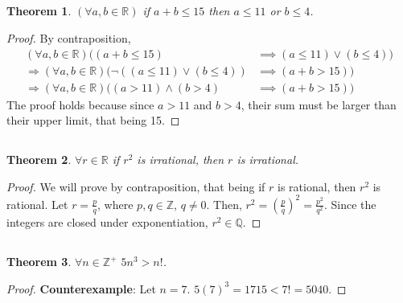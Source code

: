 \documentclass{article}
\newtheorem{genthm}{Theorem}
\newcommand{\Z}{\mathbb{Z}}
\newcommand{\Q}{\mathbb{Q}}
\newcommand{\R}{\mathbb{R}}
\begin{document}
\subsection{}

\begin{genthm}
    \((\forall a, b \in \R)\) if \(a + b \leqslant 15\) then \(a \leqslant 11\) or \(b \leqslant 4\).
\end{genthm}
\begin{proof}
By contraposition,
\begin{align}
    (\forall a, b \in \R)((a + b \leqslant 15) &\implies (a \leqslant 11) \lor (b \leqslant 4)) \\
    \Rightarrow (\forall a, b \in \R)(\lnot ((a \leqslant 11) \lor (b \leqslant 4)) &\implies (a + b > 15)) \\
    \Rightarrow (\forall a, b \in \R)((a > 11) \land (b > 4) &\implies (a + b > 15))
\end{align}
The proof holds because since \(a > 11\) and \(b > 4\), their sum must be larger than their upper limit, that being 15.
\end{proof}

\subsection{}

\begin{genthm}
    \(\forall r \in \R\) if \(r^2\) is irrational, then \(r\) is irrational.
\end{genthm}
\begin{proof}
We will prove by contraposition, that being if \(r\) is rational, then \(r^2\) is rational.
Let \(r = \frac{p}{q}\), where \(p, q \in \Z\), \(q \neq 0\).
Then, \(r^2 = \left(\frac{p}{q}\right)^2 = \frac{p^2}{q^2}\).
Since the integers are closed under exponentiation, \(r^2 \in \Q\).
\end{proof}

\subsection{}

\begin{genthm}
    \(\forall n \in \Z^+\) \(5n^3 > n!\).
\end{genthm}
\begin{proof}
\textbf{Counterexample}: Let \(n = 7\).
\(5 (7)^3 = 1715 < 7! = 5040.\)
\end{proof}
\end{document}
